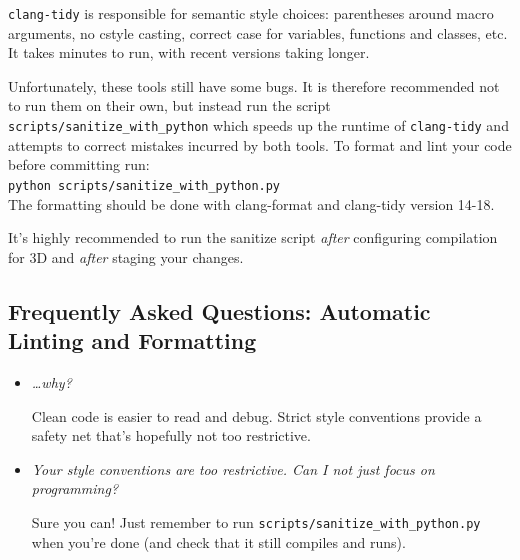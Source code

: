 \documentclass[11pt]{article}
\begin{document}
\verb|clang-tidy| is responsible for semantic style choices: parentheses around macro arguments, no cstyle casting, correct case for variables, functions and classes, etc. It takes minutes to run, with recent versions taking longer.

\begin{warning}
    Unfortunately, these tools still have some bugs. It is therefore recommended not to run them on their own, but instead run the script \verb|scripts/sanitize_with_python| which speeds up the runtime of \verb|clang-tidy| and attempts to correct mistakes incurred by both tools.
    To format and lint your code before committing run:\\
    \verb|python scripts/sanitize_with_python.py|\\
    The formatting should be done with clang-format and clang-tidy version 14-18.
\end{warning}
\begin{tip}
    It's highly recommended to run the sanitize script \emph{after} configuring compilation for 3D and \emph{after} staging your changes.
\end{tip}

\subsection*{Frequently Asked Questions: Automatic Linting and Formatting}
\begin{itemize}
    \item \emph{\ldots why?}

    Clean code is easier to read and debug. Strict style conventions provide a safety net that's hopefully not too restrictive.

    \item \emph{Your style conventions are too restrictive. Can I not just focus on programming?}
    
    Sure you can! Just remember to run \verb|scripts/sanitize_with_python.py| when you're done (and check that it still compiles and runs).

\end{itemize}
\end{document}
